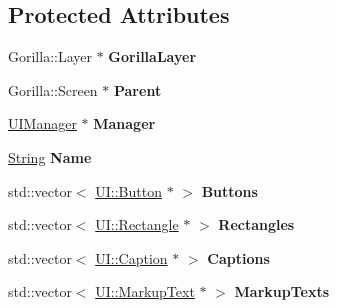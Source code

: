\subsection*{Protected Attributes}
\begin{DoxyCompactItemize}
\item 
\hypertarget{classphys_1_1UILayer_ac1cfdc64e509e8bf94b10844655ebb6c}{
Gorilla::Layer $\ast$ {\bfseries GorillaLayer}}
\label{da/d48/classphys_1_1UILayer_ac1cfdc64e509e8bf94b10844655ebb6c}

\item 
\hypertarget{classphys_1_1UILayer_a3da8314d7bcab7a0261100969d636abf}{
Gorilla::Screen $\ast$ {\bfseries Parent}}
\label{da/d48/classphys_1_1UILayer_a3da8314d7bcab7a0261100969d636abf}

\item 
\hypertarget{classphys_1_1UILayer_aa6c5cb17111c680c1af20d734dd0a3d7}{
\hyperlink{classphys_1_1UIManager}{UIManager} $\ast$ {\bfseries Manager}}
\label{da/d48/classphys_1_1UILayer_aa6c5cb17111c680c1af20d734dd0a3d7}

\item 
\hypertarget{classphys_1_1UILayer_a26df3b08c7bdcb07eeb9f0633c8d2df8}{
\hyperlink{namespacephys_aa03900411993de7fbfec4789bc1d392e}{String} {\bfseries Name}}
\label{da/d48/classphys_1_1UILayer_a26df3b08c7bdcb07eeb9f0633c8d2df8}

\item 
\hypertarget{classphys_1_1UILayer_ae2a7d6dfb30eff9bec40b6a1a208dae3}{
std::vector$<$ \hyperlink{classphys_1_1UI_1_1Button}{UI::Button} $\ast$ $>$ {\bfseries Buttons}}
\label{da/d48/classphys_1_1UILayer_ae2a7d6dfb30eff9bec40b6a1a208dae3}

\item 
\hypertarget{classphys_1_1UILayer_a5b08f8ae240427c00bba64e544f6d8dd}{
std::vector$<$ \hyperlink{classphys_1_1UI_1_1Rectangle}{UI::Rectangle} $\ast$ $>$ {\bfseries Rectangles}}
\label{da/d48/classphys_1_1UILayer_a5b08f8ae240427c00bba64e544f6d8dd}

\item 
\hypertarget{classphys_1_1UILayer_aa895120d4197d7e255bb6db2eaaa84d7}{
std::vector$<$ \hyperlink{classphys_1_1UI_1_1Caption}{UI::Caption} $\ast$ $>$ {\bfseries Captions}}
\label{da/d48/classphys_1_1UILayer_aa895120d4197d7e255bb6db2eaaa84d7}

\item 
\hypertarget{classphys_1_1UILayer_a3b9913fb2f4142d3d52c899b4347b843}{
std::vector$<$ \hyperlink{classphys_1_1UI_1_1MarkupText}{UI::MarkupText} $\ast$ $>$ {\bfseries MarkupTexts}}
\label{da/d48/classphys_1_1UILayer_a3b9913fb2f4142d3d52c899b4347b843}


\end{DoxyCompactItemize}
